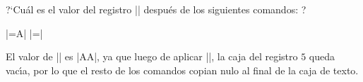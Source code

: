 


\bigskip

\enunciadoS ?`Cu\'al es el valor del registro || despu\'es de los
siguientes comandos: ?

|=\hbox{A}| \kern 0.4cm 
|=\hbox{\copy{}}|

\bigskip

\respuestaS El valor de || es |\hbox{\hbox{A}A}|, ya que luego de
aplicar ||, la caja del registro $5$ queda vac\'{\i}a, por lo
que el resto de los comandos copian nulo al final de la caja de texto.

\bye

